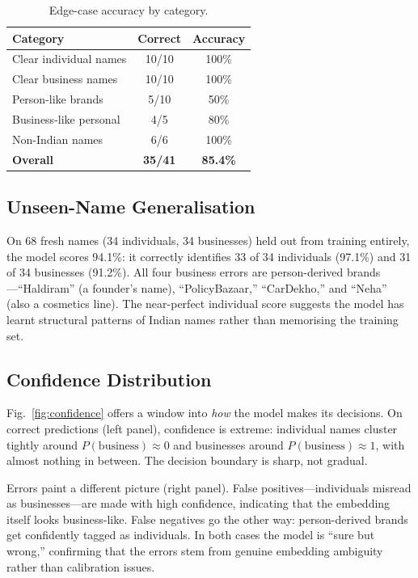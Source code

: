 \documentclass[conference]{IEEEtran}
\begin{document}
\begin{table}[!t]
\caption{Edge-case accuracy by category.}
\label{tab:edge}
\centering
\begin{tabular}{@{}lcc@{}}
\toprule
\textbf{Category} & \textbf{Correct} & \textbf{Accuracy} \\
\midrule
Clear individual names   & 10/10 & 100\% \\
Clear business names     & 10/10 & 100\% \\
Person-like brands       & 5/10  & 50\%  \\
Business-like personal   & 4/5   & 80\%  \\
Non-Indian names         & 6/6   & 100\% \\
\midrule
\textbf{Overall}         & \textbf{35/41} & \textbf{85.4\%} \\
\bottomrule
\end{tabular}
\end{table}

\subsection{Unseen-Name Generalisation}

On 68 fresh names (34 individuals, 34 businesses) held out from training entirely, the model scores 94.1\%: it correctly identifies 33 of 34 individuals (97.1\%) and 31 of 34 businesses (91.2\%). All four business errors are person-derived brands---``Haldiram'' (a founder's name), ``PolicyBazaar,'' ``CarDekho,'' and ``Neha'' (also a cosmetics line). The near-perfect individual score suggests the model has learnt structural patterns of Indian names rather than memorising the training set.

\subsection{Confidence Distribution}

Fig.~\ref{fig:confidence} offers a window into \emph{how} the model makes its decisions. On correct predictions (left panel), confidence is extreme: individual names cluster tightly around $P(\text{business})\!\approx\!0$ and businesses around $P(\text{business})\!\approx\!1$, with almost nothing in between. The decision boundary is sharp, not gradual.

Errors paint a different picture (right panel). False positives---individuals misread as businesses---are made with high confidence, indicating that the embedding itself looks business-like. False negatives go the other way: person-derived brands get confidently tagged as individuals. In both cases the model is ``sure but wrong,'' confirming that the errors stem from genuine embedding ambiguity rather than calibration issues.
\end{document}
